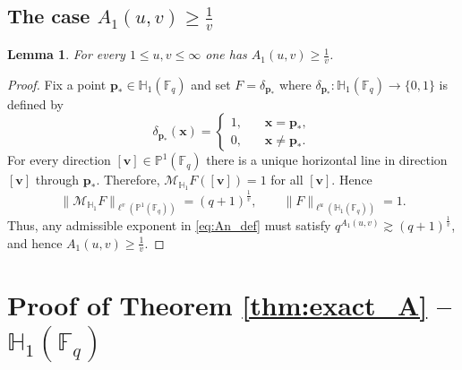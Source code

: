 \documentclass[11pt]{article}
\newtheorem{lemma}[theorem]{Lemma}
\newcommand{\1}{\mathbf 1}
\newcommand{\bfp}{\mathbf{p}}
\begin{document}
\subsection{The case $A_1(u, v)\ge \frac{1}{v}$}

\begin{lemma}
\label{lem:lb-point}
For every $1\le u,v\le\infty$ one has $A_1(u, v)\ge \frac1v$.
\end{lemma}

\begin{proof}
Fix a point $\bfp_\ast\in\mathbb{H}_1(\mathbb{F}_q)$ and set $F=\delta_{\bfp_\ast}$ where $\delta_{\bfp_\ast} :\mathbb{H}_1(\mathbb{F}_q) \to \{0,1\}$ is defined by 
\begin{equation*}
\delta_{\mathbf p_\ast} (\mathbf x)=
    \begin{cases}
        1, ~~~~~~~~\mathbf x=\bfp_\ast,\\
        0, ~~~~~~~~\mathbf x \ne \bfp_\ast.
    \end{cases}
\end{equation*}
For every direction $[\mathbf{v}]\in\mathbb{P}^1(\mathbb{F}_q)$ there is a unique horizontal line in direction $[\mathbf{v}]$ through $\mathbf p_\ast$.
Therefore, $\mathcal{M}_{\mathbb{H}_1} F([\mathbf{v}])=1$ for all $[\mathbf{v}]$.
Hence
\[
\|\mathcal{M}_{\mathbb{H}_1} F\|_{\ell^v(\mathbb{P}^1(\mathbb{F}_q))}=(q+1)^{\frac{1}{v}},
\qquad
\|F\|_{\ell^u(\mathbb{H}_1(\mathbb{F}_q))}=1.
\]
Thus, any admissible exponent in \eqref{eq:An_def} must satisfy $q^{A_1(u, v)}\gtrsim (q+1)^{\frac{1}{v}}$, and hence $A_1(u, v)\ge \frac{1}{v}$.

\end{proof}



\section{Proof of Theorem \ref{thm:exact_A} -- $\mathbb{H}_1(\mathbb{F}_q)$}\label{section6}
\end{document}
